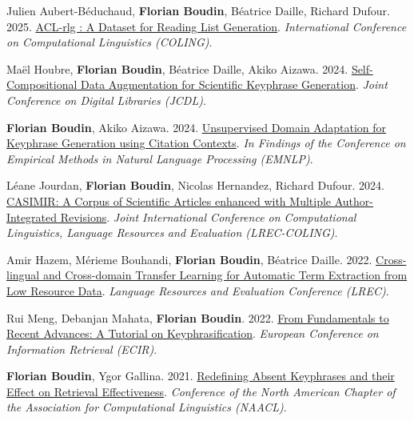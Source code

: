 \item 
Julien Aubert-Béduchaud, \textbf{Florian Boudin}, Béatrice Daille, Richard Dufour.
2025.
\href{https://aclanthology.org/2025.coling-main.327.pdf}{ACL-rlg : A Dataset for Reading List Generation}.
\textit{International Conference on Computational Linguistics (COLING)}.
\label{aubert-beduchaud-etal-2025-acl}

\item 
Maël Houbre, \textbf{Florian Boudin}, Béatrice Daille, Akiko Aizawa.
2024.
\href{https://arxiv.org/pdf/2411.03039}{Self-Compositional Data Augmentation for Scientific Keyphrase Generation}.
\textit{Joint Conference on Digital Libraries (JCDL)}.
\label{houbre-etal-2024-self}

\item
\textbf{Florian Boudin}, Akiko Aizawa.
2024.
\href{https://aclanthology.org/2024.findings-emnlp.33.pdf}{Unsupervised Domain Adaptation for Keyphrase Generation using Citation Contexts}.
\textit{In Findings of the Conference on Empirical Methods in Natural Language Processing (EMNLP)}.
\label{boudin-aizawa-2024-unsupervised}

\item 
Léane Jourdan, \textbf{Florian Boudin}, Nicolas Hernandez, Richard Dufour.
2024.
\href{https://aclanthology.org/2024.lrec-main.257.pdf}{CASIMIR: A Corpus of Scientific Articles enhanced with Multiple Author-Integrated Revisions}.
\textit{Joint International Conference on Computational Linguistics, Language Resources and Evaluation (LREC-COLING)}.
\label{jourdan-etal-2024-casimir}

\item
Amir Hazem, Mérieme Bouhandi, \textbf{Florian Boudin}, Béatrice Daille.
2022.
\href{https://aclanthology.org/2022.lrec-1.68.pdf}{Cross-lingual and Cross-domain Transfer Learning for Automatic Term Extraction from Low Resource Data}.
\textit{Language Resources and Evaluation Conference (LREC)}.
\label{hazem-etal-2022-cross}

\item
Rui Meng, Debanjan Mahata, \textbf{Florian Boudin}.
2022.
\href{https://link.springer.com/chapter/10.1007/978-3-030-99739-7_73}{From Fundamentals to Recent Advances: A Tutorial on Keyphrasification}.
\textit{European Conference on Information Retrieval (ECIR)}.
\label{meng-etal-2022-fundamentals}

\item 
\textbf{Florian Boudin}, Ygor Gallina.
2021.
\href{https://www.aclweb.org/anthology/2021.naacl-main.330.pdf}{Redefining Absent Keyphrases and their Effect on Retrieval Effectiveness}.
\textit{Conference of the North American Chapter of the Association for Computational Linguistics (NAACL)}.
\label{boudin-gallina-2021-redefining}

